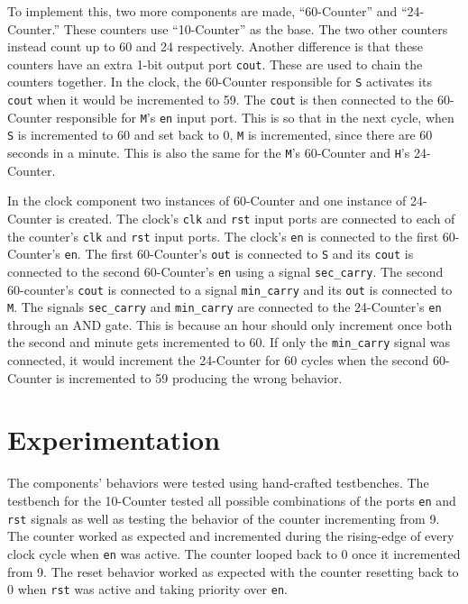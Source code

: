 \documentclass[11pt]{report}
\begin{document}
To implement this, two more components are made, ``60-Counter'' and ``24-Counter.'' These counters
use ``10-Counter'' as the base. The two other counters instead count up to 60 and 24 respectively.
Another difference is that these counters have an extra 1-bit output port \verb|cout|. These are
used to chain the counters together. In the clock, the 60-Counter responsible for \verb|S| activates
its \verb|cout| when it would be incremented to 59. The \verb|cout| is then connected to the
60-Counter responsible for \verb|M|'s \verb|en| input port. This is so that in the next cycle, when
\verb|S| is incremented to 60 and set back to 0, \verb|M| is incremented, since there are 60 seconds
in a minute. This is also the same for the \verb|M|'s 60-Counter and \verb|H|'s 24-Counter.

In the clock component two instances of 60-Counter and one instance of 24-Counter is created. The
clock's \verb|clk| and \verb|rst| input ports are connected to each of the counter's \verb|clk| and
\verb|rst| input ports. The clock's \verb|en| is connected to the first 60-Counter's \verb|en|. The
first 60-Counter's \verb|out| is connected to \verb|S| and its \verb|cout| is connected to the
second 60-Counter's \verb|en| using a signal \verb|sec_carry|. The second 60-counter's \verb|cout|
is connected to a signal \verb|min_carry| and its \verb|out| is connected to \verb|M|. The signals
\verb|sec_carry| and \verb|min_carry| are connected to the 24-Counter's \verb|en| through an AND
gate. This is because an hour should only increment once both the second and minute gets incremented
to 60. If only the \verb|min_carry| signal was connected, it would increment the 24-Counter for 60
cycles when the second 60-Counter is incremented to 59 producing the wrong behavior.

\section*{Experimentation}
The components' behaviors were tested using hand-crafted testbenches. The testbench for the
10-Counter tested all possible combinations of the ports \verb|en| and \verb|rst| signals as well as
testing the behavior of the counter incrementing from 9. The counter worked as expected and
incremented during the rising-edge of every clock cycle when \verb|en| was active. The counter
looped back to 0 once it incremented from 9. The reset behavior worked as expected with the counter
resetting back to 0 when \verb|rst| was active and taking priority over \verb|en|.
\end{document}
